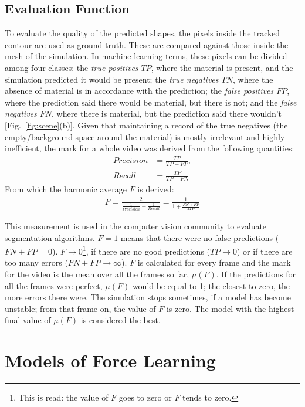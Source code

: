 \documentclass[journal]{IEEEtran}
\newcommand{\fref}[1]{Fig.~\ref{#1}}
\newcounter{algorithm}
\begin{document}
\subsection{Evaluation Function}
\label{sec:evaluation}

To evaluate the quality of the predicted shapes, the pixels inside the tracked contour are used as ground truth.  These are  compared against those inside the mesh of the simulation.  In machine learning terms, these pixels can be divided among four classes: the \textit{true positives $TP$}, where the material is present, and the simulation predicted it would be present; the \textit{true negatives $TN$}, where the absence of material is in accordance with the prediction; the \textit{false positives $FP$}, where the prediction said there would be material, but there is not; and the \textit{false negatives $FN$}, where there is material, but the prediction said there wouldn't [\fref{fig:scene}(b)].  Given that maintaining a record of the true negatives (the empty/background space around the material) is mostly irrelevant and highly inefficient, the mark for a whole video was derived from the following quantities:
\begin{align}
 Precision &= \frac{TP}{TP+FP}, \\
 Recall &= \frac{TP}{TP+FN}
\end{align}
From which the harmonic average $F$ is derived:
\begin{align}
 F = \frac{2}{\frac{1}{Precision} + \frac{1}{Recall}} = \frac{1}{1 + \frac{FN + FP}{2TP}}
\end{align}

This measurement is used in the computer vision community to evaluate segmentation algorithms.  $F=1$ means that there were no false predictions ($FN+FP = 0$).  $F \rightarrow 0$\footnote{This is read: the value of $F$ goes to zero or $F$ tends to zero.}, if there are no good predictions ($TP\rightarrow0$) or if there are too many errors ($FN+FP \rightarrow \infty$).  $F$ is calculated for every frame and the mark for the video is the mean over all the frames so far, $\mu(F)$.  If the predictions for all the frames were perfect, $\mu(F)$ would be equal to 1; the closest to zero, the more errors there were.  The simulation stops sometimes, if a model has become unstable; from that frame on, the value of $F$ is zero.  The model with the highest final value of $\mu(F)$ is considered the best.

\section{Models of Force Learning}
\label{sec:forces}
\end{document}

